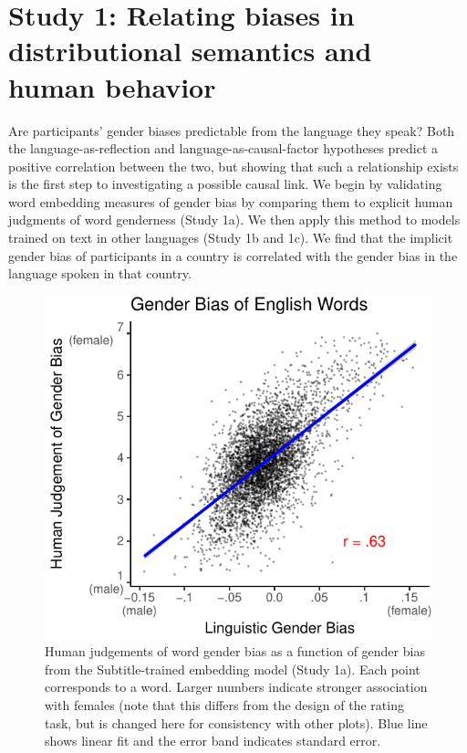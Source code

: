 \documentclass[9pt,twocolumn,twoside]{pnas-new}
\begin{document}
\section*{Study 1: Relating biases in distributional semantics and
human
behavior}\label{study-1-relating-gender-biases-in-distributional-semantics-and-human-behavior}

Are participants' gender biases predictable from the language they
speak? Both the language-as-reflection and language-as-causal-factor
hypotheses predict a positive correlation between the two, but showing
that such a relationship exists is the first step to investigating a
possible causal link. We begin by validating word embedding measures of
gender bias by comparing them to explicit human judgments of word
genderness (Study 1a). We then apply this method to models trained on
text in other languages (Study 1b and 1c). We find that the implicit gender
bias of participants in a country is correlated with the gender bias in
the language spoken in that country.



\begin{figure}
\centering
\includegraphics[width=.8\linewidth]{pnas_rmd/iat_lang_pnas_files/figure-latex/unnamed-chunk-10-1.pdf}
\caption{\label{fig:unnamed-chunk-10}Human judgements of word gender bias as
a function of gender bias from the Subtitle-trained embedding model
(Study 1a). Each point corresponds to a word. Larger numbers indicate
stronger association with females (note that this differs from the
design of the rating task, but is changed here for consistency with
other plots). Blue line shows linear fit and the error band indicates
standard error.}
\end{figure}
\end{document}
